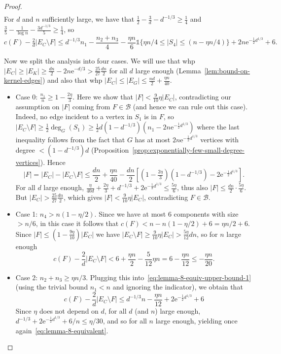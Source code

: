 \documentclass[11pt]{article}
\theoremstyle{plain}
\newcommand{\emm}{\mathrm{e}}
\newcommand{\1}{\mathbb{1}}
\begin{document}
\begin{proof}
\begin{multline*}
    \end{multline*}
    For \(d\) and $n$ sufficiently large, we  have that $\tfrac 12-\tfrac3d - d^{-1/3}\geq \tfrac 14$ and \(\tfrac 35 - \frac{1}{\log n} - \frac{3d^{-1/3}}{5} \geq \tfrac 14\), so     \begin{equation}\label{eq:lemma-8-equiv-upper-bound-1}
        c(F)-\tfrac 2d|E_C\setminus F|\leq d^{-1/3}n_1 - \frac{n_2+n_3}{4} - \frac{\eta n}{6}\1\{\eta n/4\leq |S_4|\leq (n-\eta n/4)\} + 2n\emm^{-\frac{1}{2}d^{1/3}}+6.      
    \end{equation}

    Now we split the analysis into four cases. We will use that whp \(|E_C|\geq |E_K|\geq \tfrac{dn}{2}-2n\emm^{-d/3}> \frac{25}{27}\tfrac{dn}{2}\) for all \(d\) large enough (Lemma~\ref{lem:bound-on-kernel-edges}) and also that whp \(|E_C|\leq |E_G|\leq \tfrac{nd}{2} + \tfrac{\eta n}{40}\).
    \begin{itemize}
        \item Case 0: \(\frac{n_1}{n}\geq 1-\frac{2\eta}{3}\).         Here we show that \(|F| < \tfrac{9}{10}\eta|E_C|\), contradicting our assumption on $|F|$ coming from $F\in \mathcal{B}$ (and hence we can rule out this case). Indeed, no edge incident to a vertex in \(S_1\) is in \(F\), so $|E_C\setminus F|\geq \frac{1}{2} \deg_G(S_1) \geq \tfrac12 d(1-d^{-1/3})(n_1-2n\emm^{-\frac12d^{1/3}})$ where the last inequality follows  from the fact that  \(G\) has at most $2n\emm^{-\frac12d^{1/3}}$ vertices with degree \(<(1-d^{-1/3})d\) (Proposition~\ref{prop:exponentially-few-small-degree-vertices}). Hence \[|F| = |E_C|-|E_C\setminus F| \leq \frac{dn}{2} + \frac{\eta n}{40} - \frac{dn}{2}[(1-\tfrac{2\eta}{3})(1-d^{-1/3}) - 2\emm^{-\frac12d^{1/3}}].\]
        For all \(d\) large enough, \(\tfrac{\eta}{40d} + \tfrac{2\eta}{3} + d^{-1/3} +2\emm^{-\frac12d^{1/3}}\leq \frac{5\eta}{6}\), thus also \(|F|\leq\frac{dn}{2}\cdot\frac{5\eta}{6}\). But \(|E_C| > \tfrac{25}{27}\tfrac{dn}{2}\), which gives $|F| < \frac{9}{10}\eta|E_C|$, contradicting $F\in \mathcal{B}$.

        \item Case 1: \(n_4 > n(1-\eta / 2)\). Since we have at most 6 components with size $>n/6$, in this case it follows that \(c(F) < n - n(1-\eta / 2) + 6 = \eta n/ 2 + 6\). Since $|F|\leq (1-\frac{9\eta}{10})|E_C|$ we have \(|E_C\setminus F|\geq\tfrac{9}{10}\eta |E_C| > \tfrac{5\eta}{12} dn\), so for $n$ large enough
        \[
        c(F) - \frac{2}{d}|E_C\setminus F| < 6 + \frac{\eta n}{2} - \frac{5}{12} \eta n = 6 - \frac{\eta n}{12}\leq -\frac{\eta n}{20}.
        \]
        \item Case 2: \(n_2 + n_3 \geq \eta n / 3\).        
        Plugging this into~\eqref{eq:lemma-8-equiv-upper-bound-1} (using the trivial bound \(n_1 < n\) and ignoring the indicator), we obtain that
        \[
        c(F) - \frac{2}{d}|E_C\setminus F|\leq d^{-1/3} n - \frac{\eta n}{12} + 2\emm^{-\tfrac{1}{2}d^{1/3}}+6
        \]
        Since \(\eta\) does not depend on \(d\), for all \(d\) (and $n$) large enough, \(d^{-1/3} +2\emm^{-\tfrac{1}{2}d^{1/3}}+ 6/n \leq \eta / 30\), and so for all \(n\) large enough, yielding once again~\eqref{eq:lemma-8-equivalent}.


\end{itemize}
\end{proof}
\end{document}
